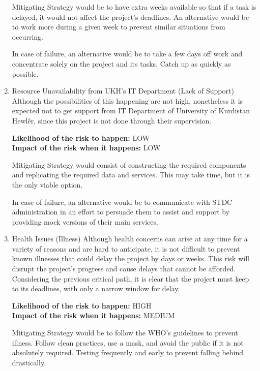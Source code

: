 \begin{justify}
\begin{enumerate}
    \newendline Mitigating Strategy would be to have extra weeks available so that if a task is delayed, it would not affect the project's deadlines. An alternative would be to work more during a given week to prevent similar situations from occurring.

    \newendline In case of failure, an alternative would be to take a few days off work and concentrate solely on the project and its tasks. Catch up as quickly as possible.\newendline

    \item Resource Unavailability from UKH’s IT Department (Lack of Support)
    \newendline Although the possibilities of this happening are not high, nonetheless it is expected not to get support from IT Department of University of Kurdistan Hewlêr, since this project is not done through their supervision.

    \newendline \textbf{\textcolor{vin}{Likelihood of the risk to happen:}} LOW\\
    \textbf{\textcolor{vin}{Impact of the risk when it happens:}} LOW

    \newendline Mitigating Strategy would consist of constructing the required components and replicating the required data and services. This may take time, but it is the only viable option.

    \newendline In case of failure, an alternative would be to communicate with STDC administration in an effort to persuade them to assist and support by providing mock versions of their main services.\newendline

    
    \item Health Issues (Illness)
    \newendline Although health concerns can arise at any time for a variety of reasons and are hard to anticipate, it is not difficult to prevent known illnesses that could delay the project by days or weeks. This risk will disrupt the project's progress and cause delays that cannot be afforded. Considering the previous critical path, it is clear that the project must keep to its deadlines, with only a narrow window for delay.

    \newendline \textbf{\textcolor{vin}{Likelihood of the risk to happen:}} HIGH\\
    \textbf{\textcolor{vin}{Impact of the risk when it happens:}} MEDIUM

    \newendline Mitigating Strategy would be to follow the WHO's guidelines to prevent illness. Follow clean practices, use a mask, and avoid the public if it is not absolutely required. Testing frequently and early to prevent falling behind drastically.


\end{enumerate}
\end{justify}
